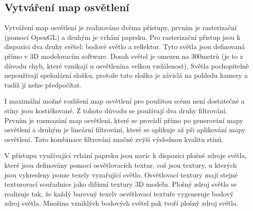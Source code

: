 \documentclass[11pt,twoside,a4paper]{book}
\begin{document}
\subsection{Vytváření map osvětlení}
Vytváření map osvětlení je realizováno dvěma přístupy, prvním je rasterizační (pomocí OpenGL) a druhým je vrhání paprsku. Pro rasterizační přistup jsou k dispozici dva druhy světel: bodové světlo a reflektor. Tyto světla jsou definovaná přímo v 3D modelovacím software. Dosah světel je omezen na 300metrů (je to z důvodu chyb, které vznikají u osvětlení\linebreak na velkou vzdálenost). Světla pochopitelně nepoužívají spekulární složku, protože tato složka je závislá na pohledu kamery a tudíž jí nelze předpočítat.

I maximální možné rozlišení map osvětlení pro použitou scénu není dostatečné a stíny jsou kostičkované. Z tohoto důvodu se používají dva druhy filtrování. Prvním je rozmazání map osvětlení, které se provádí přímo po generování mapy osvětlení a druhým je lineární filtrování, které se aplikuje až při aplikování mapy osvětlení. Tato kombinace filtrování značně zvýší výslednou kvalitu stínů.

V přístupu využívající vrhání paprsku jsou navíc k dispozici plošné zdroje světla, které jsou definovány pomocí osvětlovacích textur, což jsou textury, u kterých jsou vykresleny pouze texely vyzařující světlo. Osvětlovací textury mají stejné texturovací souřadnice jako difúzní textury 3D modelu. Plošný zdroj světla se realizuje tak, že každý barevný texel\linebreak v osvětlovací textuře vygeneruje bodový zdroj světla. Množina vzniklých bodových světel pak tvoří plošný zdroj světla.
\end{document}
